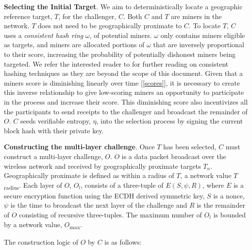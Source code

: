 \documentclass[10pt, nonatbib, nocopyrightspace, reprint]{sigplanconf}
\newcommand{\secref}[1]{[\autoref{#1}]}
\begin{document}
\textbf{Selecting the Initial Target}. We aim to deterministically locate a geographic reference target, $T$, for the challenger, $C$. Both $C$ and $T$ are miners in the network. $T$ does not need to be geographically proximate to $C$. To locate $T$, $C$ uses a \emph{consistent hash ring} $\omega$, of potential miners. $\omega$ only contains miners eligible as targets, and miners are allocated portions of $\omega$ that are inversely proportional to their score, increasing the probability of potentially dishonest miners being targeted. We refer the interested reader to \cite{hashing} for further reading on consistent hashing techniques as they are beyond the scope of this document. Given that a miners score is diminishing linearly over time \secref{scores}, it is necessary to create this inverse relationship to give low-scoring miners an opportunity to participate in the process and increase their score. This diminishing score also incentivizes all the participants to send receipts to the challenger and broadcast the remainder of $O$. $C$ seeds verifiable entropy, $\eta$, into the selection process by signing the current block hash with their private key.

\textbf{Constructing the multi-layer challenge}. Once $T$ has been selected, $C$ must construct a multi-layer challenge, $O$. $O$ is a data packet broadcast over the wireless network and received by geographically proximate targets $T_n$. Geographically proximate is defined as within a radius of $T$, a network value $T$\textsubscript{radius}. Each layer of $O$, $O_l$, consists of a three-tuple of $E\left(S, \psi, R\right)$, where $E$ is a secure encryption function using the ECDH derived symmetric key, $S$ is a nonce, $\psi$ is the time to broadcast the next layer of the challenge and $R$ is the remainder of $O$ consisting of recursive three-tuples. The maximum number of $O_l$ is bounded by a network value, $O$\textsubscript{max}.

The construction logic of $O$ by $C$ is as follows:
\end{document}
